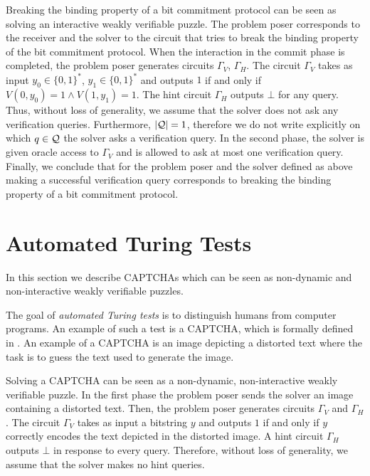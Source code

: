 Breaking the binding property of a bit commitment protocol can be seen as solving an interactive weakly verifiable puzzle.
The problem poser corresponds to the receiver and the solver to the circuit that tries to break the binding property of the bit commitment protocol.
When the interaction in the commit phase is completed, the problem poser generates circuits $\Gamma_V$, $\Gamma_H$.
The circuit $\Gamma_V$ takes as input $y_0 \in \{0,1\}^{*}$, $y_1 \in \{0,1\}^{*}$ and outputs $1$
if and only if $V(0,y_0) = 1 \land V(1,y_1) = 1$. The hint circuit $\Gamma_H$ outputs $\bot$ for any query.
Thus, without loss of generality, we assume that the solver does not ask any verification queries.
Furthermore, $|\mathcal{Q}| = 1$, therefore we do not write explicitly on which $q \in \mathcal{Q}$ the solver asks a verification query.
In the second phase, the solver is given oracle access to $\Gamma_V$ and is allowed to ask at most one verification query.
Finally, we conclude that for the problem poser and the solver defined as above making a successful verification query
corresponds to breaking the binding property of a bit commitment protocol.

\section{Automated Turing Tests}
\label{section:att}
In this section we describe CAPTCHAs which can be seen as non-dynamic
and non-interactive weakly verifiable puzzles.

The goal of \textit{automated Turing tests} is to distinguish humans from computer programs.
An example of such a test is a CAPTCHA, which is formally defined in \cite{von2003captcha}.
An example of a CAPTCHA is an image depicting a distorted text where the task is to guess the text used to generate the image.

Solving a CAPTCHA can be seen as a non-dynamic, non-interactive weakly verifiable puzzle.
In the first phase the problem poser sends the solver an image containing a distorted text.
Then, the problem poser generates circuits $\Gamma_V$ and $\Gamma_H$.
The circuit $\Gamma_V$ takes as input a bitstring $y$ and outputs $1$
if and only if $y$ correctly encodes the text depicted in the distorted image.
A hint circuit $\Gamma_H$ outputs $\bot$ in response to every query.
Therefore, without loss of generality, we assume that the solver makes no hint queries.

